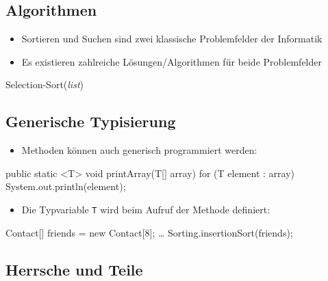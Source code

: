\documentclass[a4paper,10pt, dvipsnames]{report}
\newcommand{\javaInLine}[1]{\texttt{#1}}
\begin{document}
\subsection{Algorithmen}

\begin{itemize}
	\item Sortieren und Suchen sind zwei klassische Problemfelder der Informatik
	\item Es existieren zahlreiche Lösungen/Algorithmen für beide Problemfelder
\end{itemize}

\begin{algorithm}[H]
\DontPrintSemicolon
\caption{Selection-Sort(\textit{list})}

\end{algorithm}

\subsection{Generische Typisierung}

\begin{itemize}
	\item Methoden können auch generisch programmiert werden:
\end{itemize}


\begin{javacodebox}
public static <T> void printArray(T[] array) {
    for (T element : array)
        System.out.println(element);
}
\end{javacodebox}


\begin{itemize}
	\item Die Typvariable \javaInLine{T} wird beim Aufruf der Methode definiert:
\end{itemize}

\begin{javacodebox}
Contact[] friends = new Contact[8];
…
Sorting.insertionSort(friends);
\end{javacodebox}

\subsection{Herrsche und Teile}
\end{document}
